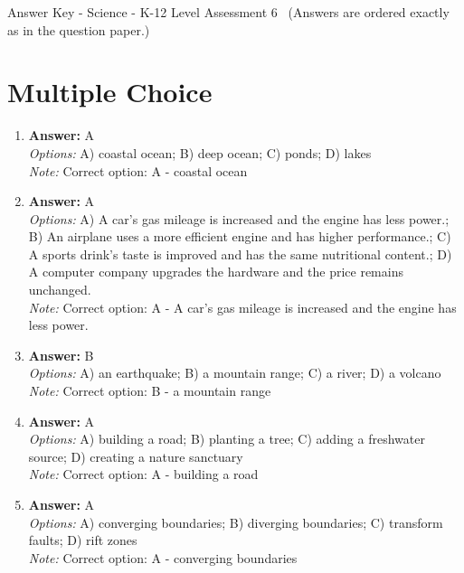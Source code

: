 \documentclass[12pt]{article}
\begin{document}
\begin{center}
Answer Key - Science - K-12 Level Assessment 6 \
\small (Answers are ordered exactly as in the question paper.)
\end{center}

\section*{Multiple Choice}
\begin{enumerate}[label=\arabic*.]
\item \textbf{Answer:} A
\\ \textit{Options:} A) coastal ocean; B) deep ocean; C) ponds; D) lakes
\\ \textit{Note:} Correct option: A - coastal ocean
\item \textbf{Answer:} A
\\ \textit{Options:} A) A car's gas mileage is increased and the engine has less power.; B) An airplane uses a more efficient engine and has higher performance.; C) A sports drink's taste is improved and has the same nutritional content.; D) A computer company upgrades the hardware and the price remains unchanged.
\\ \textit{Note:} Correct option: A - A car's gas mileage is increased and the engine has less power.
\item \textbf{Answer:} B
\\ \textit{Options:} A) an earthquake; B) a mountain range; C) a river; D) a volcano
\\ \textit{Note:} Correct option: B - a mountain range
\item \textbf{Answer:} A
\\ \textit{Options:} A) building a road; B) planting a tree; C) adding a freshwater source; D) creating a nature sanctuary
\\ \textit{Note:} Correct option: A - building a road
\item \textbf{Answer:} A
\\ \textit{Options:} A) converging boundaries; B) diverging boundaries; C) transform faults; D) rift zones
\\ \textit{Note:} Correct option: A - converging boundaries
\end{enumerate}
\end{document}
